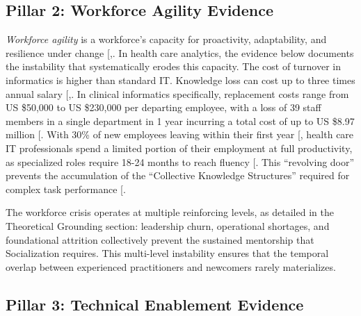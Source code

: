 \documentclass[
  american,
  11pt,
  letterpaper,
  oneside  ,captions=tableheading
]{scrartcl}
\begin{document}
\subsection{Pillar 2: Workforce Agility
Evidence}\label{pillar-2-workforce-agility-evidence}

\emph{Workforce agility} is a workforce's capacity for proactivity,
adaptability, and resilience under change
{[},\citeproc{ref-tessarini2021}{51}{]}. In
health care analytics, the evidence below documents the instability that
systematically erodes this capacity. The cost of turnover in informatics
is higher than standard IT. Knowledge loss can cost up to three times
annual salary
{[},\citeproc{ref-wynendaele2025}{52}{]}.
In clinical informatics specifically, replacement costs range from US
\$50,000 to US \$230,000 per departing employee, with a loss of 39 staff
members in a single department in 1 year incurring a total cost of up to
US \$8.97 million {[}\citeproc{ref-hackney2024}{53}{]}. With 30\% of new
employees leaving within their first year
{[}\citeproc{ref-nsi2025}{23}{]}, health care IT professionals spend a
limited portion of their employment at full productivity, as specialized
roles require 18-24 months to reach fluency
{[}\citeproc{ref-ledikwe2013}{17}{]}. This ``revolving door'' prevents
the accumulation of the ``Collective Knowledge Structures'' required for
complex task performance {[}\citeproc{ref-rao2006}{13}{]}.

The workforce crisis operates at multiple reinforcing levels, as
detailed in the Theoretical Grounding section: leadership churn,
operational shortages, and foundational attrition collectively prevent
the sustained mentorship that Socialization requires. This multi-level
instability ensures that the temporal overlap between experienced
practitioners and newcomers rarely materializes.

\subsection{Pillar 3: Technical Enablement
Evidence}\label{pillar-3-technical-enablement-evidence}
\end{document}

